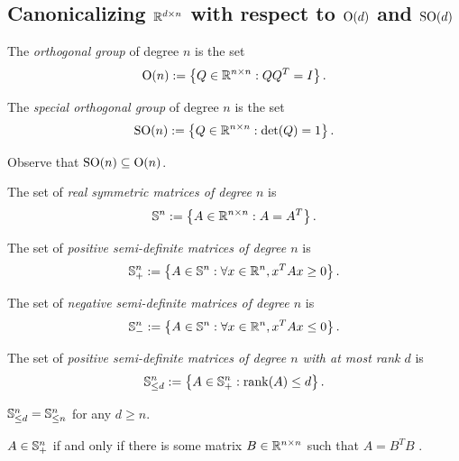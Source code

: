 \subsection{Canonicalizing $\R^{d \times n}$ with respect to $\O(d)$ and $\SO(d)$}\label{sec:canonicalizing-matrices-rotations}
\begin{definition}
    The \emph{orthogonal group} of degree $n$ is the set
    \[
        \O(n) := \set{Q \in \R^{n \times n} : Q Q^T = I}.
    \]
\end{definition}

\begin{definition}
    The \emph{special orthogonal group} of degree $n$ is the set
    \[
        \SO(n) := \set{Q \in \R^{n \times n} : \det(Q) = 1}.
    \]
\end{definition}

\begin{remark}
    Observe that $\SO(n) \sub \O(n)$.
\end{remark}

\begin{definition}
    The set of \emph{real symmetric matrices of degree $n$} is
    \[
        \S^n := \set{A \in \R^{n \times n} : A = A^T}.
    \]
\end{definition}

\begin{definition}
    The set of \emph{positive semi-definite matrices of degree $n$} is
    \[
        \S^n_+ := \set{A \in \S^n : \forall x \in \R^n, x^T A x \geq 0}.
    \]
\end{definition}

\begin{definition}
    The set of \emph{negative semi-definite matrices of degree $n$} is
    \[
        \S^n_- := \set{A \in \S^n : \forall x \in \R^n, x^T A x \leq 0}.
    \]
\end{definition}

\begin{definition}
    The set of \emph{positive semi-definite matrices of degree $n$ with at most rank $d$} is
    \[
        \S^n_{\leq d} := \set{A \in \S^n_+ : \rank(A) \leq d}.
    \]
\end{definition}

\begin{remark}
    $\S^n_{\leq d} = \S^n_{\leq n}$ for any $d \geq n$.
\end{remark}

\begin{proposition}
    $A \in \S^n_+$ if and only if there is some matrix $B \in \R^{n \times n}$ such that $A = B^T B$ \cite{wikipedia:definite-matrices}.
\end{proposition}

